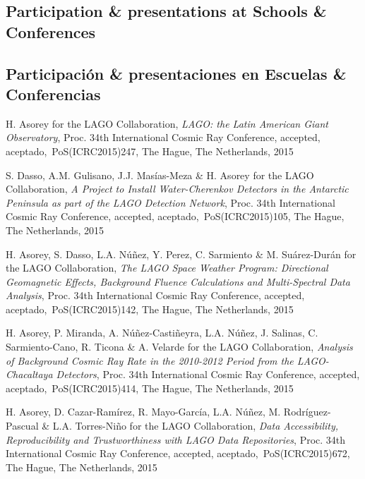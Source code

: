 \ifeng
\subsection*{Participation \& presentations at Schools \& Conferences}
\else
\subsection*{Participación \& presentaciones en Escuelas \& Conferencias}
\fi
\noindent
\begin{etaremune}

\item {}H. Asorey for the LAGO Collaboration, {\emph{LAGO: the Latin American Giant Observatory}}, \en Proc. 34th International Cosmic Ray Conference, \ifeng accepted, \else aceptado,\fi\ PoS(ICRC2015)247, The Hague, The Netherlands, 2015

\item {}S. Dasso, A.M. Gulisano, J.J. Masías-Meza \& H. Asorey for the LAGO Collaboration, {\emph{A Project to Install Water-Cherenkov Detectors in the Antarctic Peninsula as part of the LAGO Detection Network}}, \en Proc. 34th International Cosmic Ray Conference, \ifeng accepted, \else aceptado,\fi\ PoS(ICRC2015)105, The Hague, The Netherlands, 2015

\item {}H. Asorey, S. Dasso, L.A. Núñez, Y. Perez, C. Sarmiento \& M. Suárez-Durán for the LAGO Collaboration, {\emph{The LAGO Space Weather Program: Directional Geomagnetic Effects, Background Fluence Calculations and Multi-Spectral Data Analysis}}, \en Proc. 34th International Cosmic Ray Conference, \ifeng accepted, \else aceptado,\fi\ PoS(ICRC2015)142, The Hague, The Netherlands, 2015

\item {}H. Asorey, P. Miranda, A. Núñez-Castiñeyra, L.A. Núñez, J. Salinas, C. Sarmiento-Cano, R. Ticona \& A. Velarde for the LAGO Collaboration, {\emph{Analysis of Background Cosmic Ray Rate in the 2010-2012 Period from the LAGO-Chacaltaya Detectors}}, \en Proc. 34th International Cosmic Ray Conference, \ifeng accepted, \else aceptado,\fi\ PoS(ICRC2015)414, The Hague, The Netherlands, 2015

\item {}H. Asorey, D. Cazar-Ramírez, R. Mayo-García, L.A. Núñez, M. Rodríguez-Pascual \& L.A. Torres-Niño for the LAGO Collaboration, {\emph{Data Accessibility, Reproducibility and Trustworthiness with LAGO Data Repositories}}, \en Proc. 34th International Cosmic Ray Conference, \ifeng accepted, \else aceptado,\fi\ PoS(ICRC2015)672, The Hague, The Netherlands, 2015


\end{etaremune}

